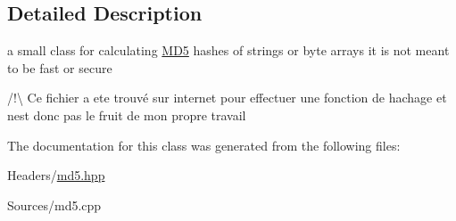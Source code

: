 \subsection{Detailed Description}
a small class for calculating \mbox{\hyperlink{classMD5}{M\+D5}} hashes of strings or byte arrays it is not meant to be fast or secure 

/!\textbackslash{} Ce fichier a ete trouvé sur internet pour effectuer une fonction de hachage et n\textquotesingle{}est donc pas le fruit de mon propre travail 

The documentation for this class was generated from the following files\+:\begin{DoxyCompactItemize}
\item 
Headers/\mbox{\hyperlink{md5_8hpp}{md5.\+hpp}}\item 
Sources/md5.\+cpp\end{DoxyCompactItemize}
